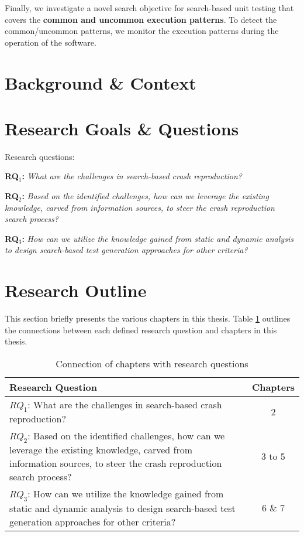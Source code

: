 Finally, we investigate a novel search objective for search-based unit testing that covers the \textbf{common and uncommon execution patterns}. To detect the common/uncommon patterns, we monitor the execution patterns during the operation of the software.

\section{Background \& Context}



\section{Research Goals \& Questions}
Research questions:


\textbf{RQ$_1$: } \textit{What are the challenges in search-based crash reproduction?}

\textbf{RQ$_2$: } \textit{Based on the identified challenges, how can we leverage the existing knowledge, carved from information sources, to steer the crash reproduction search process?}

\textbf{RQ$_3$: } \textit{How can we utilize the knowledge gained from static and dynamic analysis to design search-based test generation approaches for other criteria?}


\section{Research Outline}

This section briefly presents the various chapters in this thesis.
Table \ref{tab:chaptersvsRQs} outlines the connections between each defined research question and chapters in this thesis.


\begin{table}[!t]
\caption{Connection of chapters with research questions}
\label{tab:chaptersvsRQs}
\begin{tabular}{|p{}||c|}
\textbf{Research Question} & \textbf{Chapters}\\
\hline
\hline
$RQ_1$: What are the challenges in search-based crash reproduction? & 2\\
$RQ_2$: Based on the identified challenges, how can we leverage the existing knowledge, carved from information sources, to steer the crash reproduction search process? & 3 to 5\\
$RQ_3$: How can we utilize the knowledge gained from static and dynamic analysis to design search-based test generation approaches for other criteria? & 6 \& 7\\
\hline
\end{tabular}
\end{table}


